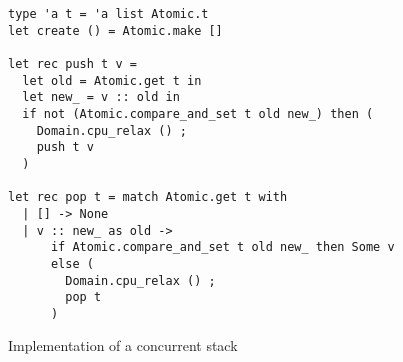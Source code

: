 \begin{figure}[t!]
\begin{verbatim}
type 'a t = 'a list Atomic.t
let create () = Atomic.make []

let rec push t v =
  let old = Atomic.get t in
  let new_ = v :: old in
  if not (Atomic.compare_and_set t old new_) then (
    Domain.cpu_relax () ;
    push t v
  )

let rec pop t = match Atomic.get t with
  | [] -> None
  | v :: new_ as old ->
      if Atomic.compare_and_set t old new_ then Some v
      else (
        Domain.cpu_relax () ;
        pop t
      )
\end{verbatim}
\caption{Implementation of a concurrent stack}
\label{fig:stack}
\end{figure}

